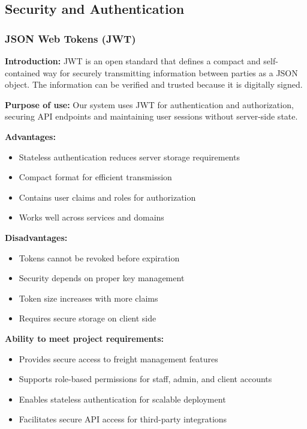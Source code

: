 \subsection{Security and Authentication}
\subsubsection{JSON Web Tokens (JWT)}
\textbf{Introduction:} JWT \cite{jwt} is an open standard that defines a compact and self-contained way for securely transmitting information between parties as a JSON object. The information can be verified and trusted because it is digitally signed.

\textbf{Purpose of use:} Our system uses JWT for authentication and authorization, securing API endpoints and maintaining user sessions without server-side state.

\textbf{Advantages:}
\begin{itemize}
    \item Stateless authentication reduces server storage requirements
    \item Compact format for efficient transmission
    \item Contains user claims and roles for authorization
    \item Works well across services and domains
\end{itemize}

\textbf{Disadvantages:}
\begin{itemize}
    \item Tokens cannot be revoked before expiration
    \item Security depends on proper key management
    \item Token size increases with more claims
    \item Requires secure storage on client side
\end{itemize}

\textbf{Ability to meet project requirements:}
\begin{itemize}
    \item Provides secure access to freight management features
    \item Supports role-based permissions for staff, admin, and client accounts
    \item Enables stateless authentication for scalable deployment
    \item Facilitates secure API access for third-party integrations
\end{itemize}

